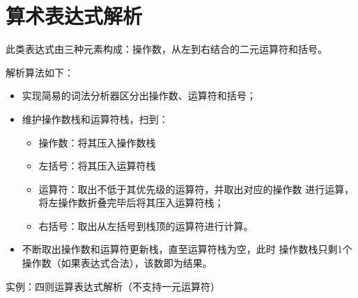 \section{算术表达式解析}
此类表达式由三种元素构成：操作数，从左到右结合的二元运算符和括号。

解析算法如下：
\begin{itemize}
	\item 实现简易的词法分析器区分出操作数、运算符和括号；
	\item 维护操作数栈和运算符栈，扫到：
	      \begin{itemize}
		      \item 操作数：将其压入操作数栈
		      \item 左括号：将其压入运算符栈
		      \item 运算符：取出不低于其优先级的运算符，并取出对应的操作数
		            进行运算，将左操作数折叠完毕后将其压入运算符栈；
		      \item 右括号：取出从左括号到栈顶的运算符进行计算。
	      \end{itemize}
	\item 不断取出操作数和运算符更新栈，直至运算符栈为空，此时
	      操作数栈只剩1个操作数（如果表达式合法），该数即为结果。
\end{itemize}

实例：四则运算表达式解析（不支持一元运算符）

